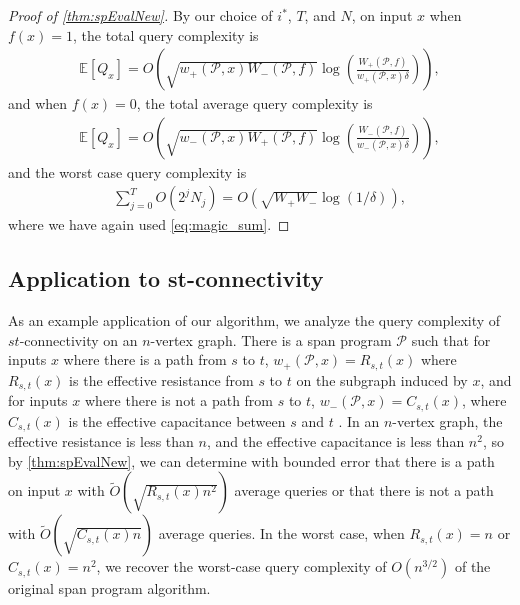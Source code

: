 \documentclass[cleveref, autoref, thm-restate,11pt]{article}
\theoremstyle{definition}
\newcommand{\sop}[1]{{\mathcal #1}}
\renewcommand{\wp}[2]{{w_+({#1},{#2})}}
\newcommand{\wm}[2]{{w_-({#1},{#2})}}
\begin{document}
\begin{proof}[Proof of \cref{thm:spEvalNew}]
By our choice of $i^*$, $T$, and $N$, on input $x$ when $f(x)=1$,
the total query complexity is 
\begin{align}
\mathbb{E}[Q_x]=O\left(\sqrt{\wp{\sop P}{x}W_-(\sop P,f)}\log\left(\frac{W_+(\sop P,f)}{\wp{\sop P}{x} \delta}\right)\right),
\end{align}
and when $f(x)=0$,
the total average query complexity is 
\begin{align}
\mathbb{E}[Q_x]=O\left(\sqrt{\wm{\sop P}{x}W_+(\sop P,f)}\log\left(\frac{W_-(\sop P,f)}{\wm{\sop P}{x} \delta}\right)\right),
\end{align}
and the worst case query complexity is 
\begin{align} \label{eq:worst_case}
    \sum_{j=0}^{T} O\left(2^jN_j\right)=O\left(\sqrt{W_+W_-}\log(1/\delta)\right),
\end{align}
where we have again used \cref{eq:magic_sum}.
\end{proof}



\subsection{Application to st-connectivity}

As an example application of our algorithm, we analyze the query complexity of
$st$-connectivity on an $n$-vertex graph. There is a span program
$\mathcal{P}$ such that for inputs $x$ where there is a path from $s$
to $t$, $\wp{\mathcal{P}}{x}=R_{s,t}(x)$ where $R_{s,t}(x)$ is the effective
resistance from $s$ to $t$ on the subgraph induced by $x$,
 and for inputs $x$ where there is not a
path from $s$ to $t$, $\wm{\mathcal{P}}{x}=C_{s,t}(x)$, where $C_{s,t}(x)$ is the
effective capacitance between $s$ and $t$
\cite{belovsSpanProgramsQuantum2012,jarretQuantumAlgorithmsConnectivity2018}. In an $n$-vertex graph, the effective resistance is less than $n$, and the effective capacitance is less than $n^{2}$, so by \cref{thm:spEvalNew}, we can determine with bounded error that there is a path on input $x$ with $\tilde{O}(\sqrt{R_{s,t}(x)n^2})$ average queries or that there is not a path with
$\tilde{O}(\sqrt{C_{s,t}(x)n})$ average queries. In the worst case, when $R_{s,t}(x)=n$ or
$C_{s,t}(x)=n^2$, we recover the worst-case query complexity of $O(n^{3/2})$ of the original
span program algorithm.
\end{document}
